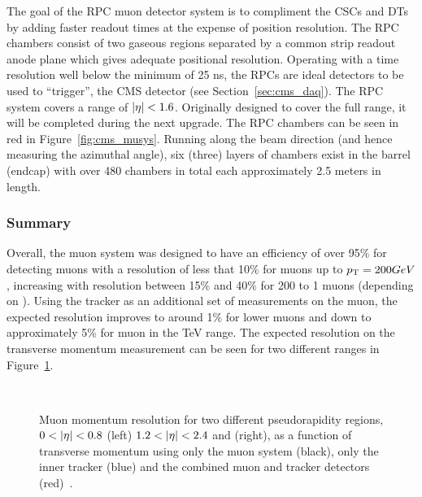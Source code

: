 The goal of the RPC muon detector system is to compliment the CSCs and DTs
by adding faster readout times at the expense of position resolution. The
RPC chambers consist of two gaseous regions separated by a common
strip readout anode plane which gives adequate positional resolution.
Operating with a time resolution well below the minimum of 25 ns,
the RPCs are ideal detectors to be used to ``trigger'', the CMS detector
(see Section~\ref{sec:cms_daq}). The RPC system covers a \pr range of
$\left|\eta\right| < 1.6$. Originally designed to cover the full range, it will be
completed during the next upgrade. The RPC chambers can be seen in red in
Figure~\ref{fig:cms_musys}. Running along the beam direction (and hence
measuring the azimuthal angle), six (three) layers of chambers exist in the
barrel (endcap) with over 480 chambers in total each approximately 2.5 meters
in length.

\subsubsection{Summary}
\label {sec:cms_musys_summary}

Overall, the muon system was designed to have an efficiency of over 95\% for
detecting muons with a resolution of less that 10\% for muons up to $p_{\mathrm{T}} =
200 GeV$, increasing with resolution between 15\% and 40\% for 200 \GeV to 1
\TeV muons (depending on \aeta). Using the tracker as an additional set of
measurements on the muon, the expected resolution improves to around 1\% for
lower \pt muons and down to approximately 5\% for muon in the TeV range. The
expected resolution on the transverse momentum measurement can be seen for two
different \pr ranges in Figure~\ref{fig:cms_mures}.

\begin{figure}[tbhp]
\begin{center}
 \hspace{5mm}
 \\
\caption[Muon momentum resolution for two different pseudorapidity regions]
{\label{fig:cms_mures}
Muon momentum resolution for two different pseudorapidity regions, $0< \left|\eta\right|
<0.8$ (left) $1.2< \left|\eta\right| <2.4$ and (right), as a function of transverse
momentum using only the muon system (black), only the inner tracker (blue) and
the combined muon and tracker detectors (red)~\cite{tdr1}.
}
\end{center}
\end{figure} 

